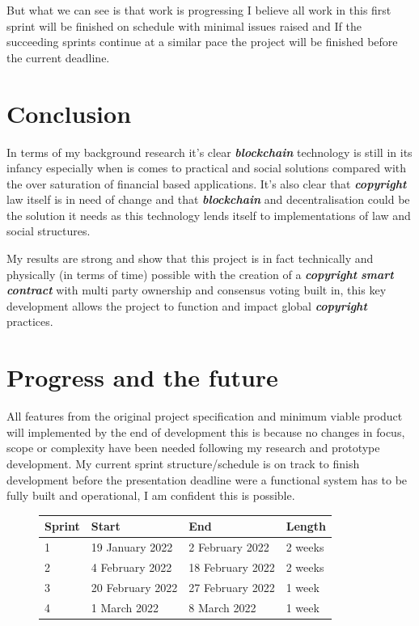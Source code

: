 \documentclass[12pt]{article}
\newcommand{\keyword}[1]{\textbf{\textit{#1}}}
\begin{document}
But what we can see is that work is progressing I believe all work in this first sprint will be finished on schedule with minimal issues raised and If the succeeding sprints continue at a similar pace the project will be finished before the current deadline.

\section{Conclusion}

In terms of my background research it's clear \keyword{blockchain} technology is still in its infancy especially when is comes to practical and social solutions compared with the over saturation of financial based applications. It's also clear that \keyword{copyright} law itself is in need of change and that \keyword{blockchain} and decentralisation could be the solution it needs as this technology lends itself to implementations of law and social structures.

My results are strong and show that this project is in fact technically and physically (in terms of time) possible with the creation of a \keyword{copyright} \keyword{smart contract} with multi party ownership and consensus voting built in, this key development allows the project to function and impact global \keyword{copyright} practices.

\section{Progress and the future}

All features from the original project specification and minimum viable product will implemented by the end of development this is because no changes in focus, scope or complexity have been needed following my research and prototype development. My current sprint structure/schedule is on track to finish development before the presentation deadline were a functional system has to be fully built and operational, I am confident this is possible.

\begin{figure}[h]
\hfil
\begin{tabular}{|l|l|l|l|}
\hline
Sprint & Start            & End              & Length  \\ \hline
1      & 19 January 2022  & 2 February 2022  & 2 weeks \\ \hline
2      & 4 February 2022  & 18 February 2022 & 2 weeks \\ \hline
3      & 20 February 2022 & 27 February 2022 & 1 week  \\ \hline
4      & 1 March 2022     & 8 March 2022     & 1 week  \\ \hline
\end{tabular}
\end{figure}



\end{document}
